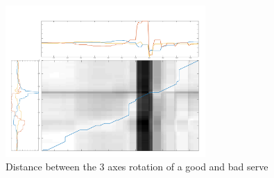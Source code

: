 \begin{figure}
\centering
\includegraphics[width=3in]{resources/distance.jpg}
\caption{Distance between the 3 axes rotation of a good and bad serve}
\label{fig-distance}
\end{figure}